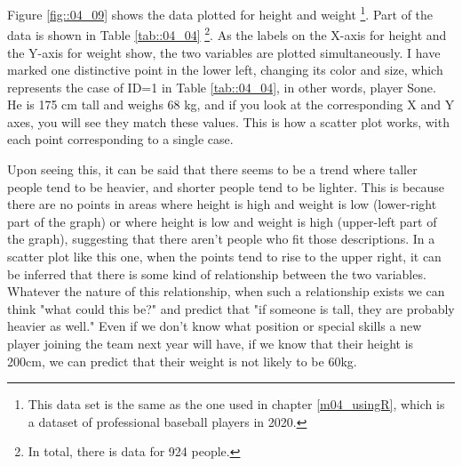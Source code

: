 \documentclass{ltjbook}
\begin{document}
Figure \ref{fig::04_09} shows the data plotted for height and weight \footnote{This data set is the same as the one used in chapter \ref{m04_usingR}, which is a dataset of professional baseball players in 2020.}. Part of the data is shown in Table \ref{tab::04_04} \footnote{In total, there is data for 924 people.}. As the labels on the X-axis for height and the Y-axis for weight show, the two variables are plotted simultaneously. I have marked one distinctive point in the lower left, changing its color and size, which represents the case of ID=1 in Table \ref{tab::04_04}, in other words, player Sone. He is 175 cm tall and weighs 68 kg, and if you look at the corresponding X and Y axes, you will see they match these values. This is how a scatter plot works, with each point corresponding to a single case.

Upon seeing this, it can be said that there seems to be a trend where taller people tend to be heavier, and shorter people tend to be lighter. This is because there are no points in areas where height is high and weight is low (lower-right part of the graph) or where height is low and weight is high (upper-left part of the graph), suggesting that there aren't people who fit those descriptions. In a scatter plot like this one, when the points tend to rise to the upper right, it can be inferred that there is some kind of relationship between the two variables. Whatever the nature of this relationship, when such a relationship exists we can think "what could this be?" and predict that "if someone is tall, they are probably heavier as well." Even if we don't know what position or special skills a new player joining the team next year will have, if we know that their height is 200cm, we can predict that their weight is not likely to be 60kg.
\end{document}
